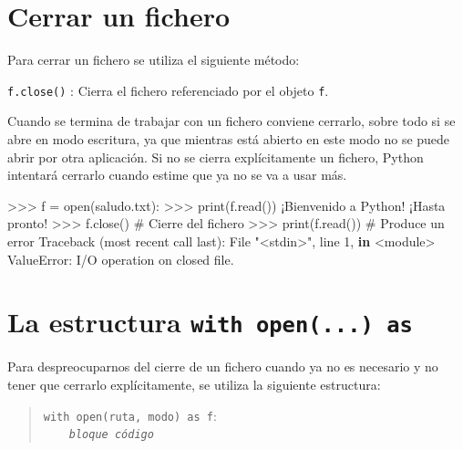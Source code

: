 \documentclass[
  spanish,
  a4paper,
]{scrreport}
\newenvironment{Shaded}{\begin{snugshade}}{\end{snugshade}}
\newcommand{\BuiltInTok}[1]{\textcolor[rgb]{0.00,0.23,0.31}{#1}}
\newcommand{\CommentTok}[1]{\textcolor[rgb]{0.37,0.37,0.37}{#1}}
\newcommand{\DecValTok}[1]{\textcolor[rgb]{0.68,0.00,0.00}{#1}}
\newcommand{\KeywordTok}[1]{\textcolor[rgb]{0.00,0.23,0.31}{\textbf{#1}}}
\newcommand{\NormalTok}[1]{\textcolor[rgb]{0.00,0.23,0.31}{#1}}
\newcommand{\OperatorTok}[1]{\textcolor[rgb]{0.37,0.37,0.37}{#1}}
\newcommand{\PreprocessorTok}[1]{\textcolor[rgb]{0.68,0.00,0.00}{#1}}
\newcommand{\StringTok}[1]{\textcolor[rgb]{0.13,0.47,0.30}{#1}}
\begin{document}
\section{Cerrar un fichero}\label{cerrar-un-fichero}

Para cerrar un fichero se utiliza el siguiente método:

\texttt{f.close()} : Cierra el fichero referenciado por el objeto
\texttt{f}.

Cuando se termina de trabajar con un fichero conviene cerrarlo, sobre
todo si se abre en modo escritura, ya que mientras está abierto en este
modo no se puede abrir por otra aplicación. Si no se cierra
explícitamente un fichero, Python intentará cerrarlo cuando estime que
ya no se va a usar más.

\begin{Shaded}
\begin{Highlighting}[]
\OperatorTok{\textgreater{}\textgreater{}\textgreater{}}\NormalTok{ f }\OperatorTok{=} \BuiltInTok{open}\NormalTok{(}\StringTok{\textquotesingle{}saludo.txt\textquotesingle{}}\NormalTok{):}
\OperatorTok{\textgreater{}\textgreater{}\textgreater{}} \BuiltInTok{print}\NormalTok{(f.read())}
\NormalTok{¡Bienvenido a Python}\OperatorTok{!}
\NormalTok{¡Hasta pronto}\OperatorTok{!}
\OperatorTok{\textgreater{}\textgreater{}\textgreater{}}\NormalTok{ f.close()  }\CommentTok{\# Cierre del fichero}
\OperatorTok{\textgreater{}\textgreater{}\textgreater{}} \BuiltInTok{print}\NormalTok{(f.read())  }\CommentTok{\# Produce un error}
\NormalTok{Traceback (most recent call last):}
\NormalTok{  File }\StringTok{"\textless{}stdin\textgreater{}"}\NormalTok{, line }\DecValTok{1}\NormalTok{, }\KeywordTok{in} \OperatorTok{\textless{}}\NormalTok{module}\OperatorTok{\textgreater{}}
\PreprocessorTok{ValueError}\NormalTok{: I}\OperatorTok{/}\NormalTok{O operation on closed }\BuiltInTok{file}\NormalTok{.}
\end{Highlighting}
\end{Shaded}

\section{\texorpdfstring{La estructura
\texttt{with\ open(...)\ as}}{La estructura with open(...) as}}\label{la-estructura-with-open...-as}

Para despreocuparnos del cierre de un fichero cuando ya no es necesario
y no tener que cerrarlo explícitamente, se utiliza la siguiente
estructura:

\begin{quote}
\texttt{with\ open(ruta,\ modo)\ as\ f}:\\
    \emph{\texttt{bloque\ código}}
\end{quote}
\end{document}
